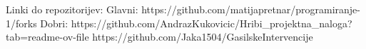 Linki do repozitorijev:
Glavni: 
    https://github.com/matijapretnar/programiranje-1/forks
Dobri:
    https://github.com/AndrazKukovicic/Hribi_projektna_naloga?tab=readme-ov-file
    https://github.com/Jaka1504/GasilskeIntervencije
    
